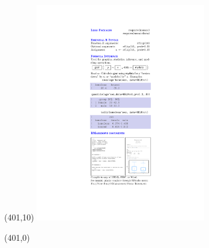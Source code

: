 \documentclass{article}
\begin{document}
\begin{textblock}{3}(401,10) %
\noindent\includegraphics[width=2.9in]{frontflap.pdf}
\end{textblock}


\begin{textblock}{3}(401,0) %
\noindent{}
\end{textblock}
\end{document}
